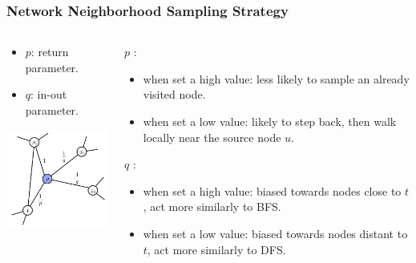 \documentclass[10pt, aspectratio=169]{beamer}
\begin{document}
\begin{frame}
    \frametitle{Network Neighborhood Sampling Strategy}
    \begin{columns}
        \begin{column}{0.5\textwidth}
            \begin{itemize}
                \item[] $p$: return parameter.
                \item[] $q$: in-out parameter.
            \end{itemize}
            \begin{center}
                \includegraphics[width=5cm]{./graphics/biasrandomwalk.png}
            \end{center}
        \end{column}
        \begin{column}{0.5\textwidth}
            $p$ :
            \begin{itemize}
                \item when set a high value: less likely to sample
an already visited node.
                \item when set a low value: likely to step back, then walk locally near the source node $u$.
            \end{itemize}
            $q$ :
            \begin{itemize}
                \item when set a high value: biased towards nodes close to $t$, act more similarly to BFS.
                \item when set a low value: biased towards nodes distant to $t$, act more similarly to DFS.
            \end{itemize}
        \end{column}
    \end{columns}
\end{frame}
\end{document}
